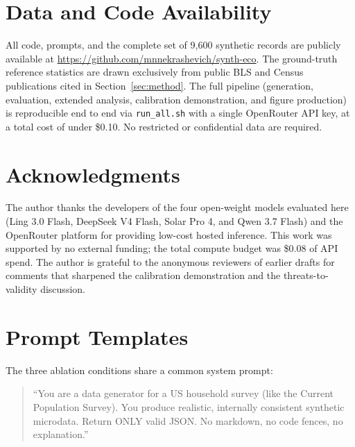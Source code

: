 \documentclass[11pt]{article}
\begin{document}
\section*{Data and Code Availability}
\label{sec:data}

All code, prompts, and the complete set of 9{,}600 synthetic records are publicly available at \url{https://github.com/mnnekrashevich/synth-eco}.
The ground-truth reference statistics are drawn exclusively from public BLS and Census publications cited in Section~\ref{sec:method}.
The full pipeline (generation, evaluation, extended analysis, calibration demonstration, and figure production) is reproducible end to end via \texttt{run\_all.sh} with a single OpenRouter API key, at a total cost of under \$0.10.
No restricted or confidential data are required.

\section*{Acknowledgments}

The author thanks the developers of the four open-weight models evaluated here (Ling 3.0 Flash, DeepSeek V4 Flash, Solar Pro 4, and Qwen 3.7 Flash) and the OpenRouter platform for providing low-cost hosted inference.
This work was supported by no external funding; the total compute budget was \$0.08 of API spend.
The author is grateful to the anonymous reviewers of earlier drafts for comments that sharpened the calibration demonstration and the threats-to-validity discussion.

\appendix
\section{Prompt Templates}
\label{app:prompts}

The three ablation conditions share a common system prompt:
\begin{quote}
\small
``You are a data generator for a US household survey (like the Current Population Survey). You produce realistic, internally consistent synthetic microdata. Return ONLY valid JSON. No markdown, no code fences, no explanation.''
\end{quote}
\end{document}
